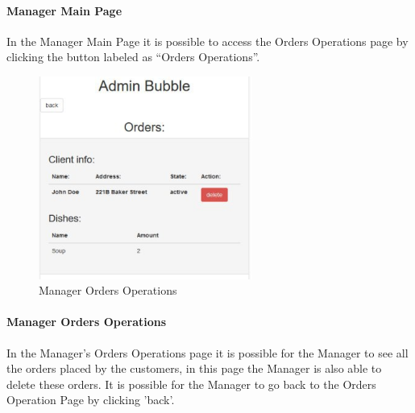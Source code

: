 \paragraph{Manager Main Page}
In the Manager Main Page it is possible to access the Orders Operations page by clicking the button labeled as ``Orders Operations''.

\begin{figure}[H]
	\centering
	\includegraphics[width=7cm]{../../documenti/UserManualDemo/demo_screens/admin_orders.png}
	\caption{Manager Orders Operations}
\end{figure}
\paragraph{Manager Orders Operations}
In the Manager's Orders Operations page it is possible for the Manager to see all the orders placed by the customers, in this page the Manager is also able to delete these orders.
It is possible for the Manager to go back to the Orders Operation Page by clicking 'back'.



